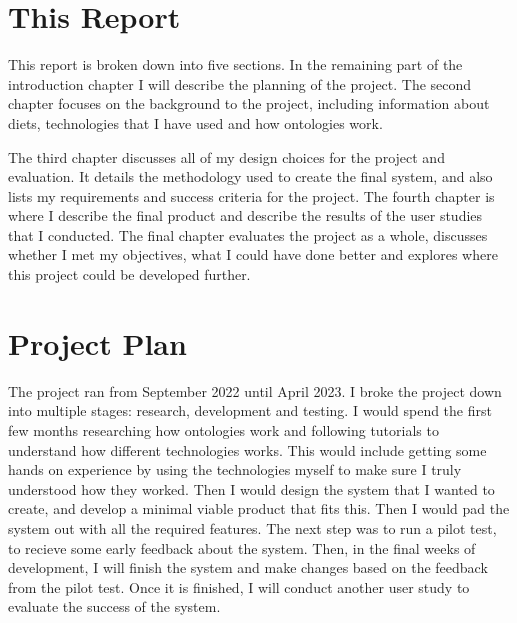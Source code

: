 \section{This Report}

This report is broken down into five sections. In the remaining part of the introduction chapter I will describe the planning of the project. The second chapter focuses on the background to the project, including information about diets, technologies that I have used and how ontologies work.

The third chapter discusses all of my design choices for the project and evaluation. It details the methodology used to create the final system, and also lists my requirements and success criteria for the project. The fourth chapter is where I describe the final product and describe the results of the user studies that I conducted. The final chapter evaluates the project as a whole, discusses whether I met my objectives, what I could have done better and explores where this project could be developed further.

\section{Project Plan}

The project ran from September 2022 until April 2023. I broke the project down into multiple stages: research, development and testing. I would spend the first few months researching how ontologies work and following tutorials to understand how different technologies works. This would include getting some hands on experience by using the technologies myself to make sure I truly understood how they worked. Then I would design the system that I wanted to create, and develop a minimal viable product that fits this. Then I would pad the system out with all the required features. The next step was to run a pilot test, to recieve some early feedback about the system. Then, in the final weeks of development, I will finish the system and make changes based on the feedback from the pilot test. Once it is finished, I will conduct another user study to evaluate the success of the system.


